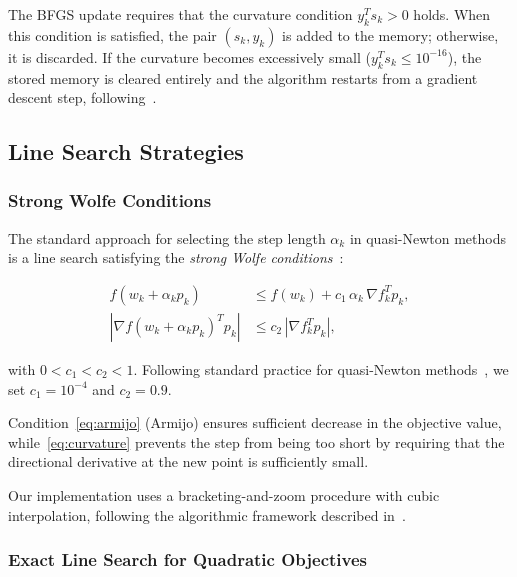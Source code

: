 \documentclass[11pt,a4paper]{article}
\begin{document}
The BFGS update requires that the curvature condition $y_k^T s_k > 0$ holds. 
When this condition is satisfied, the pair $(s_k, y_k)$ is added to the memory; 
otherwise, it is discarded. If the curvature becomes excessively small 
($y_k^T s_k \leq 10^{-16}$), the stored memory is cleared entirely and the algorithm 
restarts from a gradient descent step, following~\cite{liu1989limited}.


\subsection{Line Search Strategies}
\label{sec:linesearch}

\subsubsection{Strong Wolfe Conditions}

The standard approach for selecting the step length $\alpha_k$ in quasi-Newton methods 
is a line search satisfying the \emph{strong Wolfe conditions}~\cite[Eq.~3.7]{nocedal2006numerical}:

\begin{align}
    f(w_k + \alpha_k p_k) &\leq f(w_k) + c_1\, \alpha_k\, \nabla f_k^T p_k, \label{eq:armijo} \\
    \left|\nabla f(w_k + \alpha_k p_k)^T p_k\right| &\leq c_2\, \left|\nabla f_k^T p_k\right|, \label{eq:curvature}
\end{align}

with $0 < c_1 < c_2 < 1$. Following standard practice for quasi-Newton 
methods~\cite{nocedal2006numerical}, we set $c_1 = 10^{-4}$ and $c_2 = 0.9$.

Condition~\eqref{eq:armijo} (Armijo) ensures sufficient decrease in the objective value, 
while~\eqref{eq:curvature} prevents the step from being too short by requiring that the 
directional derivative at the new point is sufficiently small.

Our implementation uses a bracketing-and-zoom procedure with cubic interpolation, 
following the algorithmic framework described in~\cite[Section~3.5]{nocedal2006numerical}.


\subsubsection{Exact Line Search for Quadratic Objectives}
\label{sec:exact_ls}
\end{document}
